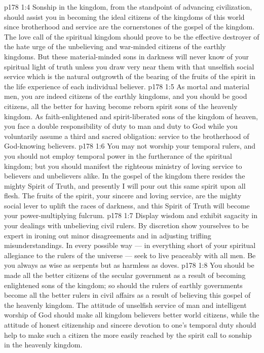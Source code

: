 \vs p178 1:4 Sonship in the kingdom, from the standpoint of advancing civilization, should assist you in becoming the ideal citizens of the kingdoms of this world since brotherhood and service are the cornerstones of the gospel of the kingdom. The love call of the spiritual kingdom should prove to be the effective destroyer of the hate urge of the unbelieving and war\hyp{}minded citizens of the earthly kingdoms. But these material\hyp{}minded sons in darkness will never know of your spiritual light of truth unless you draw very near them with that unselfish social service which is the natural outgrowth of the bearing of the fruits of the spirit in the life experience of each individual believer.
\vs p178 1:5 As mortal and material men, you are indeed citizens of the earthly kingdoms, and you should be good citizens, all the better for having become reborn spirit sons of the heavenly kingdom. As faith\hyp{}enlightened and spirit\hyp{}liberated sons of the kingdom of heaven, you face a double responsibility of duty to man and duty to God while you voluntarily assume a third and sacred obligation: service to the brotherhood of God\hyp{}knowing believers.
\vs p178 1:6 You may not worship your temporal rulers, and you should not employ temporal power in the furtherance of the spiritual kingdom; but you should manifest the righteous ministry of loving service to believers and unbelievers alike. In the gospel of the kingdom there resides the mighty Spirit of Truth, and presently I will pour out this same spirit upon all flesh. The fruits of the spirit, your sincere and loving service, are the mighty social lever to uplift the races of darkness, and this Spirit of Truth will become your power\hyp{}multiplying fulcrum.
\vs p178 1:7 Display wisdom and exhibit sagacity in your dealings with unbelieving civil rulers. By discretion show yourselves to be expert in ironing out minor disagreements and in adjusting trifling misunderstandings. In every possible way --- in everything short of your spiritual allegiance to the rulers of the universe --- seek to live peaceably with all men. Be you always as wise as serpents but as harmless as doves.
\vs p178 1:8 You should be made all the better citizens of the secular government as a result of becoming enlightened sons of the kingdom; so should the rulers of earthly governments become all the better rulers in civil affairs as a result of believing this gospel of the heavenly kingdom. The attitude of unselfish service of man and intelligent worship of God should make all kingdom believers better world citizens, while the attitude of honest citizenship and sincere devotion to one’s temporal duty should help to make such a citizen the more easily reached by the spirit call to sonship in the heavenly kingdom.
